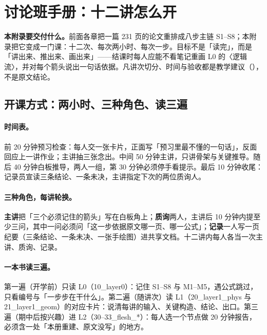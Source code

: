 
\section{讨论班手册：十二讲怎么开}
\label{sec:seminar}

\begin{keyidea}
\textbf{本附录要交付什么。}前面各章把一篇 231 页的论文重排成八步主链 S1--S8；本附录把它变成一门课：十二次、每次两小时、每次一步。目标不是「读完」，而是「讲出来、推出来、画出来」——结课时每人应能不看笔记重画 L0 的〈逻辑流〉，并对每个箭头说出一句话依据。凡讲次切分、时间与验收都是教学建议（\pC），不是原文结论。
\end{keyidea}

\subsection{开课方式：两小时、三种角色、读三遍}

\paragraph{时间表。}前 20 分钟预习检查：每人交一张卡片，正面写「预习里最不懂的一句话」，反面回应上一讲作业；主讲抽三张念出。中间 50 分钟主讲，只讲骨架与关键推导。随后 40 分钟白板推导，两人一组，第 30 分钟必须停手看提示。最后 10 分钟收尾：记录员宣读三条结论、一条未决，主讲指定下次的两位质询人。\pC

\paragraph{三种角色，每讲轮换。}\textbf{主讲}把「三个必须记住的箭头」写在白板角上；\textbf{质询}两人，主讲后 10 分钟内提至少三问，其中一问必须问「这一步依据原文哪一页、哪一公式」；\textbf{记录}一人写一页纪要（三条结论、一条未决、一张手绘图）进共享文档。十二讲内每人各当一次主讲、质询、记录。\pC

\paragraph{一本书读三遍。}第一遍（开学前）只读 L0（10\_layer0）：记住 S1--S8 与 M1--M5，遇公式跳过，只看编号与「一步步在干什么」。第二遍（随讲次）读 L1（20\_layer1\_phys 与 21\_layer1\_geom）的对应卡片：说清每讲的输入、关键构造、结论、出口。第三遍（期中后按兴趣）进 L2（30--33\_flesh\_*）：每人选一个节点做 20 分钟报告，必须含一处「本册重建、原文没写」的地方。\pC

